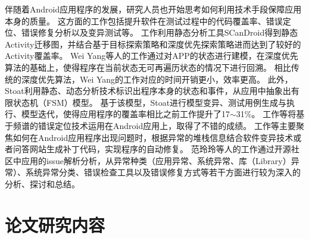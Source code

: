伴随着Android应用程序的发展，研究人员也开始思考如何利用技术手段保障应用本身的质量。
这方面的工作包括提升软件在测试过程中的代码覆盖率\cite{azim2013targeted,yang2013grey,su2016fsmdroid,androidtest2}、错误定位\cite{mirzaei2015exception,machado2013mzoltar}、错误修复分析\cite{tan2018repairing,QingGaoASE15}以及变异测试\cite{MutationOperatorsAndroid,deng2015towards,linares2017enabling}等。
工作\cite{azim2013targeted}利用静态分析工具SCanDroid得到静态Activity迁移图，并结合基于目标探索策略和深度优先探索策略进而达到了较好的Activity覆盖率。
Wei Yang等人的工作\cite{yang2013grey}通过对APP的状态进行建模，在深度优先算法的基础上，使得程序在当前状态无可再遍历状态的情况下进行回溯。
相比传统的深度优先算法，Wei Yang的工作对应的时间开销更小，效率更高。
此外，Stoat\cite{su2016fsmdroid,androidtest2}利用静态、动态分析技术标识出程序本身的状态和事件，从应用中抽象出有限状态机（FSM）模型。
基于该模型，Stoat进行模型变异、测试用例生成与执行、模型迭代，使得应用程序的覆盖率相比之前工作\cite{hao2014puma,amalfitano2015mobiguitar}提升了17$\sim$31\%。
工作\cite{mirzaei2015exception,machado2013mzoltar}等将基于频谱的错误定位技术运用在Android应用上，取得了不错的成绩。
工作\cite{tan2018repairing,QingGaoASE15}等主要聚焦如何在Android应用程序出现问题时，根据异常的堆栈信息结合软件变异技术或者问答网站生成补丁代码，实现程序的自动修复。
范玲玲等人的工作\cite{fan2018large}通过开源社区中应用的issue解析分析，从异常种类（应用异常、系统异常、库（Library）异常）、系统异常分类、错误检查工具以及错误修复方式等若干方面进行较为深入的分析、探讨和总结。




\section{论文研究内容}


